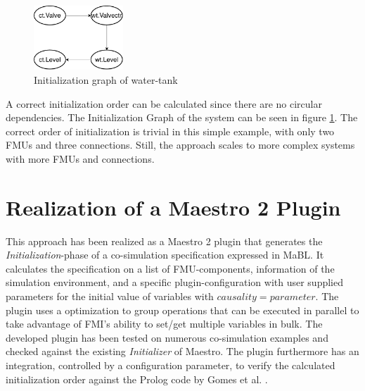 \documentclass[runningheads]{llncs}
\begin{document}
\begin{figure}
  \begin{center}
  \includegraphics[width=0.30\textwidth]{images/InitializationGraph.pdf}
  \end{center}
    \caption{Initialization graph of water-tank}
  \label{fig:initilizationGraph}
\end{figure}
\noindent A correct initialization order can be calculated since there are no circular dependencies. The Initialization Graph of the system can be seen in figure \ref{fig:initilizationGraph}. The correct order of initialization is trivial in this simple example, with only two FMUs and three connections. Still, the approach scales to more complex systems with more FMUs and connections.%
\newline
\newline
\newline
\newline
\section{Realization of a Maestro 2 Plugin}\label{sc:implementation}
This approach has been realized as a Maestro 2 plugin that generates the \textit{Initialization}-phase of a co-simulation specification expressed in MaBL. It calculates the specification on a list of FMU-components, information of the simulation environment, and a specific plugin-configuration with user supplied parameters for the initial value of variables with $causality=parameter$. The plugin uses a optimization to group operations that can be executed in parallel to take advantage of FMI's ability to set/get multiple variables in bulk.
The developed plugin has been tested on numerous co-simulation examples and checked against the existing \textit{Initializer} of Maestro. The plugin furthermore has an integration, controlled by a configuration parameter, to verify the calculated initialization order against the Prolog code by Gomes et al. \cite{gomes_lucio_vangheluwe_2019}. 
\end{document}
